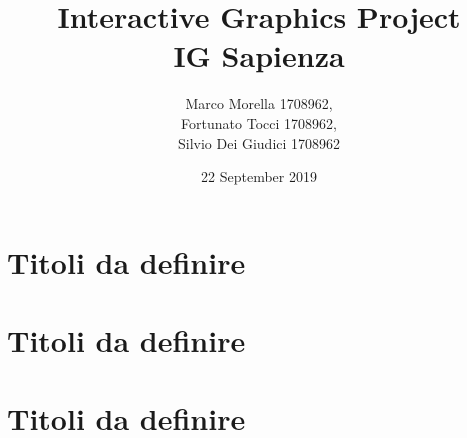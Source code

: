 \documentclass[a4paper, 11pt]{article}
\title { Interactive Graphics Project\\ \bigskip \large IG Sapienza}
\date{22 September 2019}
\author{Marco Morella 1708962, \\Fortunato Tocci 1708962, \\Silvio Dei Giudici 1708962}
\begin{document}
\maketitle

\section{Titoli da definire}
\section{Titoli da definire}
\section{Titoli da definire}
\end{document}
